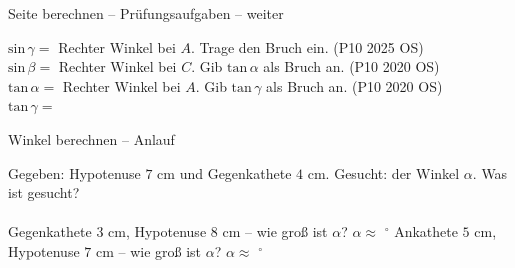 \begin{aufgabe}{Seite berechnen – Prüfungsaufgaben – weiter}
\begin{teile}
$\mathrm{sin}\,\gamma =$ \leerfeld
\teil Rechter Winkel bei $A$. Trage den Bruch ein. \hfill (P10 2025 OS) \\

$\mathrm{sin}\,\beta =$ \leerfeld
\teil Rechter Winkel bei $C$. Gib $\mathrm{tan}\,\alpha$ als Bruch an. \hfill (P10 2020 OS) \\

$\mathrm{tan}\,\alpha =$ \leerfeld
\teil Rechter Winkel bei $A$. Gib $\mathrm{tan}\,\gamma$ als Bruch an. \hfill (P10 2020 OS) \\

$\mathrm{tan}\,\gamma =$ \leerfeld
\end{teile}
\end{aufgabe}

\begin{aufgabe}{Winkel berechnen – Anlauf}
\begin{teile}
\teil Gegeben: Hypotenuse $7$ cm und Gegenkathete $4$ cm. Gesucht: der Winkel $\alpha$. Was ist gesucht? \\  \\ 
\teil Gegenkathete $3$ cm, Hypotenuse $8$ cm – wie groß ist $\alpha$? $\alpha \approx$ \leerfeld $^\circ$
\teil Ankathete $5$ cm, Hypotenuse $7$ cm – wie groß ist $\alpha$? $\alpha \approx$ \leerfeld $^\circ$
\end{teile}
\end{aufgabe}

